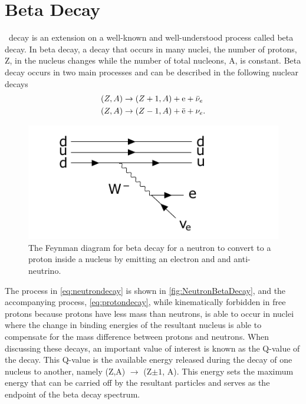 \section{Beta Decay}
\label{sec:Beta Decay}
\zeronubb~decay is an extension on a well-known and well-understood process called beta decay. In beta decay, a decay that occurs in many nuclei, the number of protons, Z, in the nucleus changes while the number of total nucleons, A, is constant.
Beta decay occurs in two main processes and can be described in the following nuclear decays
\begin{align}
    (Z, A) & \rightarrow (Z+1, A)+\textrm{e}+\Bar{\nu}_e \label{eq:neutrondecay} \\
    (Z, A) & \rightarrow (Z-1, A)+\Bar{\textrm{e}}+\nu_e. \label{eq:protondecay}
\end{align}
\begin{figure}[tbph]
    \centering
    \includegraphics[width=0.8\linewidth]{Figures/NeutronBetaDecay.pdf}
    \caption[Beta Decay Feynman diagram for a neutron converting to a proton]
    {The Feynman diagram for beta decay for a neutron to convert to a proton inside a nucleus by emitting an electron and and anti-neutrino.}
    \label{fig:NeutronBetaDecay}
\end{figure}
The process in \autoref{eq:neutrondecay} is shown in \autoref{fig:NeutronBetaDecay}, and the accompanying process, \autoref{eq:protondecay}, while kinematically forbidden in free protons because protons have less mass than neutrons, is able to occur in nuclei where the change in binding energies of the resultant nucleus is able to compensate for the mass difference between protons and neutrons.
When discussing these decays, an important value of interest is known as the Q-value of the decay.
This Q-value is the available energy released during the decay of one nucleus to another, namely (Z,A) $\rightarrow$ (Z$\pm1$, A).
This energy sets the maximum energy that can be carried off by the resultant particles and serves as the endpoint of the beta decay spectrum. 
